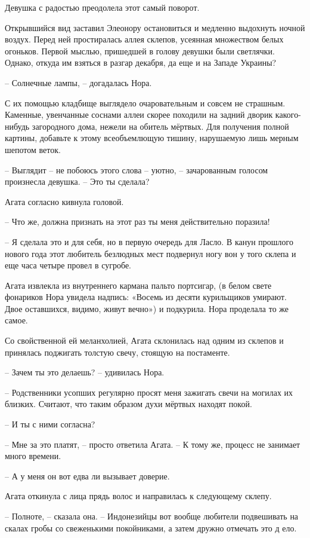 \documentclass[
  a5paperpaper,
  DIV=11,
  numbers=noendperiod]{scrreprt}
\begin{document}
Девушка с радостью преодолела этот самый поворот.

Открывшийся вид заставил Элеонору остановиться и медленно выдохнуть
ночной воздух. Перед ней простиралась аллея склепов, усеянная множеством
белых огоньков. Первой мыслью, пришедшей в голову девушки были
светлячки. Однако, откуда им взяться в разгар декабря, да еще и на
Западе Украины?

-- Солнечные лампы, -- догадалась Нора.

С их помощью кладбище выглядело очаровательным и совсем не страшным.
Каменные, увенчанные соснами аллеи скорее походили на задний дворик
какого-нибудь загородного дома, нежели на обитель мёртвых. Для получения
полной картины, добавьте к этому всеобъемлющую тишину, нарушаемую лишь
мерным шепотом веток.

-- Выглядит -- не побоюсь этого слова -- уютно, -- зачарованным голосом
произнесла девушка. -- Это ты сделала?

Агата согласно кивнула головой.

-- Что же, должна признать на этот раз ты меня действительно поразила!

-- Я сделала это и для себя, но в первую очередь для Ласло. В канун
прошлого нового года этот любитель безлюдных мест подвернул ногу вон у
того склепа и еще часа четыре провел в сугробе.

Агата извлекла из внутреннего кармана пальто портсигар, (в белом свете
фонариков Нора увидела надпись: «Восемь из десяти курильщиков умирают.
Двое оставшихся, видимо, живут вечно») и подкурила. Нора проделала то же
самое.

Со свойственной ей меланхолией, Агата склонилась над одним из склепов и
принялась поджигать толстую свечу, стоящую на постаменте.

-- Зачем ты это делаешь? -- удивилась Нора.

-- Родственники усопших регулярно просят меня зажигать свечи на могилах
их близких. Считают, что таким образом духи мёртвых находят покой.

-- И ты с ними согласна?

-- Мне за это платят, -- просто ответила Агата. -- К тому же, процесс не
занимает много времени.

-- А у меня он вот едва ли вызывает доверие.

Агата откинула с лица прядь волос и направилась к следующему склепу.

-- Полноте, -- сказала она. -- Индонезийцы вот вообще любители
подвешивать на скалах гробы со свеженькими покойниками, а затем дружно
отмечать это д ело.
\end{document}
